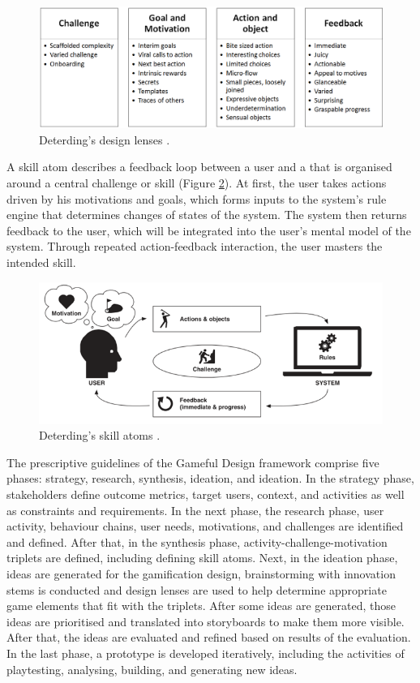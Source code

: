 \documentclass[12pt, a4paper]{report}
\begin{document}
{\begin{figure}[ht]
\centering
\includegraphics[width=14cm]{lenses}
\caption{Deterding's design lenses \cite{deterding2015lens}.}
\label{lenses}
\end{figure}

A skill atom describes a feedback loop between a user and a that is organised around a central challenge or skill (Figure \ref{skill-atoms}). At first, the user takes actions driven by his motivations and goals, which forms inputs to the system's rule engine that determines changes of states of the system. The system then returns feedback to the user, which will be integrated into the user's mental model of the system. Through repeated action-feedback interaction, the user masters the intended skill.

\begin{figure}[ht]
\centering
\includegraphics[width=14cm]{skill-atoms}
\caption{Deterding's skill atoms \cite{deterding2015lens}.}
\label{skill-atoms}
\end{figure}

The prescriptive guidelines of the Gameful Design framework comprise five phases: strategy, research, synthesis, ideation, and ideation. In the strategy phase, stakeholders define outcome metrics, target users, context, and activities as well as constraints and requirements. In the next phase, the research phase, user activity, behaviour chains, user needs, motivations, and challenges are identified and defined. After that, in the synthesis phase, activity-challenge-motivation triplets are defined, including defining skill atoms. Next, in the ideation phase, ideas are generated for the gamification design, brainstorming with innovation stems is conducted and design lenses are used to help determine appropriate game elements that fit with the triplets. After some ideas are generated, those ideas are prioritised and translated into storyboards to make them more visible. After that, the ideas are evaluated and refined based on results of the evaluation. In the last phase, a prototype is developed iteratively, including the activities of playtesting, analysing, building, and generating new ideas. 

}
\end{document}
